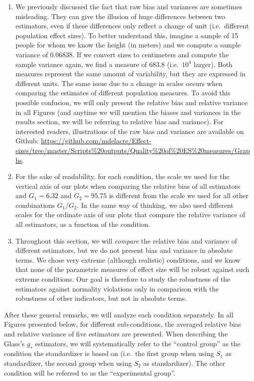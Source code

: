 \documentclass[
  english,
  man,floatsintext]{apa6}
\begin{document}
\begin{enumerate}
\def\labelenumi{\arabic{enumi})}
\item
  We previously discussed the fact that raw bias and variances are sometimes misleading. They can give the illusion of huge differences between two estimators, even if these differences only reflect a change of unit (i.e.~different population effect sizes). To better understand this, imagine a sample of 15 people for whom we know the height (in meters) and we compute a sample variance of 0.06838. If we convert sizes to centimeters and compute the sample variance again, we find a measure of 683.8 (i.e.~\(10^4\) larger). Both measures represent the same amount of variability, but they are expressed in different units. The same issue due to a change in scales occurs when comparing the estimates of different population measures. To avoid this possible confusion, we will only present the relative bias and relative variance in all Figures (and anytime we will mention the biases and variances in the results section, we will be referring to relative bias and variance). For interested readers, illustrations of the raw bias and variance are available on Github: \url{https://github.com/mdelacre/Effect-sizes/tree/master/Scripts\%20outputs/Quality\%20of\%20ES\%20measures/Graphs}.
\item
  For the sake of readability, for each condition, the scale we used for the vertical axis of our plots when comparing the relative bias of all estimators and \(G_1 = 6.32\) and \(G_2 = 95.75\) is different from the scale we used for all other combinations \(G_1/G_2\). In the same way of thinking, we also used different scales for the ordinate axis of our plots that compare the relative variance of all estimators, as a function of the condition.
\item
  Throughout this section, we will \emph{compare} the relative bias and variance of different estimators, but we do not present bias and variance in absolute terms. We chose very extreme (although realistic) conditions, and we know that none of the parametric measures of effect size will be robust against such extreme conditions. Our goal is therefore to study the robustness of the estimators against normality violations only in comparison with the robustness of other indicators, but not in absolute terms.
\end{enumerate}

After these general remarks, we will analyze each condition separately. In all Figures presented below, for different sub-conditions, the averaged relative bias and relative variance of five estimators are presented. When describing the Glass's \(g_s\) estimators, we will systematically refer to the \enquote{control group} as the condition the standardizer is based on (i.e.~the first group when using \(S_1\) as standardizer, the second group when using \(S_2\) as standardizer). The other condition will be referred to as the \enquote{experimental group}.
\end{document}
